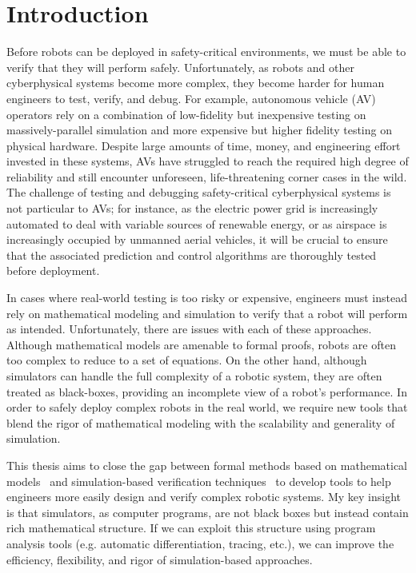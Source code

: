 \chapter{Introduction}\label{section:introduction}

Before robots can be deployed in safety-critical environments, we must be able to verify that they will perform safely. Unfortunately, as robots and other cyberphysical systems become more complex, they become harder for human engineers to test, verify, and debug. For example, autonomous vehicle (AV) operators rely on a combination of low-fidelity but inexpensive testing on massively-parallel simulation and more expensive but higher fidelity testing on physical hardware. Despite large amounts of time, money, and engineering effort invested in these systems, AVs have struggled to reach the required high degree of reliability and still encounter unforeseen, life-threatening corner cases in the wild. The challenge of testing and debugging safety-critical cyberphysical systems is not particular to AVs; for instance, as the electric power grid is increasingly automated to deal with variable sources of renewable energy, or as airspace is increasingly occupied by unmanned aerial vehicles, it will be crucial to ensure that the associated prediction and control algorithms are thoroughly tested before deployment.

In cases where real-world testing is too risky or expensive, engineers must instead rely on mathematical modeling and simulation to verify that a robot will perform as intended. Unfortunately, there are issues with each of these approaches. Although mathematical models are amenable to formal proofs, robots are often too complex to reduce to a set of equations. On the other hand, although simulators can handle the full complexity of a robotic system, they are often treated as black-boxes, providing an incomplete view of a robot's performance. In order to safely deploy complex robots in the real world, we require new tools that blend the rigor of mathematical modeling with the scalability and generality of simulation.

This thesis aims to close the gap between formal methods based on mathematical models~\cite{beltaFormalMethodsControl2019,kress-gazitSynthesisRobotsGuarantees2018} and simulation-based verification techniques~\cite{zhouRoCUSRobotController2021,corsoSurveyAlgorithmsBlackBox2021,okellyScalableEndtoEndAutonomous2018} to develop tools to help engineers more easily design and verify complex robotic systems. My key insight is that simulators, as computer programs, are not black boxes but instead contain rich mathematical structure. If we can exploit this structure using program analysis tools (e.g. automatic differentiation, tracing, etc.), we can improve the efficiency, flexibility, and rigor of simulation-based approaches.

